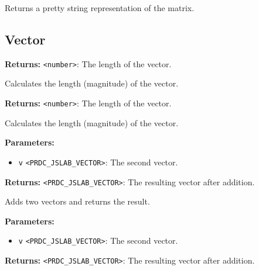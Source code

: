 \documentclass[12pt,a4paper]{article}
\begin{document}
\noindent Returns a pretty string representation of the matrix.


\subsection{Vector}
\vspace{5mm}
\noindent {}


\noindent \textbf{Returns:} \texttt{<number>}: The length of the vector.

\noindent Calculates the length (magnitude) of the vector.

\vspace{5mm}
\noindent {}


\noindent \textbf{Returns:} \texttt{<number>}: The length of the vector.

\noindent Calculates the length (magnitude) of the vector.

\vspace{5mm}
\noindent {}


\noindent \textbf{Parameters:}
\begin{itemize}
  \item \texttt{v} \texttt{<PRDC\_JSLAB\_VECTOR>}: The second vector.
\end{itemize}

\noindent \textbf{Returns:} \texttt{<PRDC\_JSLAB\_VECTOR>}: The resulting vector after addition.

\noindent Adds two vectors and returns the result.

\vspace{5mm}
\noindent {}


\noindent \textbf{Parameters:}
\begin{itemize}
  \item \texttt{v} \texttt{<PRDC\_JSLAB\_VECTOR>}: The second vector.
\end{itemize}

\noindent \textbf{Returns:} \texttt{<PRDC\_JSLAB\_VECTOR>}: The resulting vector after addition.
\end{document}
